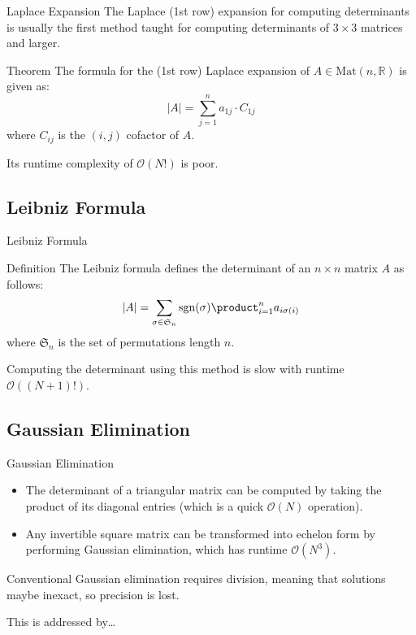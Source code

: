 \documentclass{beamer}
\begin{document}
\begin{frame}{Laplace Expansion}
    The Laplace (1st row) expansion for computing determinants is usually the first method taught for
    computing determinants of $3 \times 3$ matrices and larger.

    \begin{block}{Theorem}
        The formula for the (1st row) Laplace expansion of $A \in \mathrm{Mat}(n, \mathbb{R})$ is given as:
        \[
            |A| = \sum_{j=1}^n a_{1j}\cdot C_{1j}
        \]
        where $C_{ij}$ is the $(i, j)$ cofactor of $A$.
    \end{block}

    Its runtime complexity of $\mathcal{O}(N!)$ is poor.

\end{frame}

\subsection{Leibniz Formula}

\begin{frame}{Leibniz Formula}
    \begin{block}{Definition}
        The Leibniz formula defines the determinant of an $n \times n$ matrix $A$ as follows:
        \[
            |A| = \sum_{\sigma \in \mathfrak{S}_n} \mathrm{sgn}(\sigma) \product_{i=1}^n a_{i \sigma(i)}
        \]
        where $\mathfrak{S}_n$ is the set of permutations length $n$.
    \end{block}

    Computing the determinant using this method is slow with runtime $\mathcal{O}((N+1)!)$.
\end{frame}

\subsection{Gaussian Elimination}

\begin{frame}{Gaussian Elimination}

    \begin{itemize}

        \item The determinant of a triangular matrix can be computed by taking the product of its
            diagonal entries (which is a quick $\mathcal{O}(N)$ operation).

        \item Any invertible square matrix can be transformed into echelon form by performing
            Gaussian elimination, which has runtime $\mathcal{O}(N^3)$.

    \end{itemize}
    Conventional Gaussian elimination requires division, meaning that solutions maybe inexact,
    so precision is lost.

    This is addressed by\dots

\end{frame}
\end{document}
